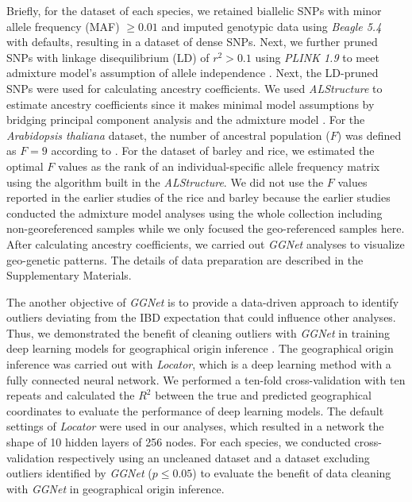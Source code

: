 \documentclass[11pt]{article}
\begin{document}
Briefly, for the dataset of each species, we retained biallelic SNPs with minor allele frequency (MAF) $\geq 0.01$ and imputed genotypic data using \textit{Beagle 5.4} \citep{browning2018one} with defaults, resulting in a dataset of dense SNPs.
Next, we further pruned SNPs with linkage disequilibrium (LD) of $r^2 > 0.1$ using \textit{PLINK 1.9} \citep{chang2015second} to meet admixture model's assumption of allele independence \citep{cabreros2019likelihood}.
Next, the LD-pruned SNPs were used for calculating ancestry coefficients.
We used \textit{ALStructure} \citep{cabreros2019likelihood} to estimate ancestry coefficients since it makes minimal model assumptions by bridging principal component analysis and the admixture model \citep{cabreros2019likelihood}.
For the \textit{Arabidopsis thaliana} dataset, the number of ancestral population ($F$) was defined as $F=9$ according to \cite{alonso20161}.
For the dataset of barley and rice, we estimated the optimal $F$ values as the rank of an individual-specific allele frequency matrix using the algorithm built in the \textit{ALStructure}.
We did not use the $F$ values reported in the earlier studies of the rice \citep{alonso20161} and barley \citep{milner2019genebank} because the earlier studies conducted the admixture model analyses using the whole collection including non-georeferenced samples while we only focused the geo-referenced samples here.
After calculating ancestry coefficients, we carried out \textit{GGNet} analyses to visualize geo-genetic patterns.
The details of data preparation are described in the Supplementary Materials.


The another objective of \textit{GGNet} is to provide a data-driven approach to identify outliers deviating from the IBD expectation that could influence other analyses.
Thus, we demonstrated the benefit of cleaning outliers with \textit{GGNet} in training deep learning models for geographical origin inference \citep{battey2020predicting}.
The geographical origin inference was carried out with \textit{Locator}, which is a deep learning method with a fully connected neural network.
We performed a ten-fold cross-validation with ten repeats and calculated the $R^2$ between the true and predicted geographical coordinates to evaluate the performance of deep learning models.
The default settings of \textit{Locator} were used in our analyses, which resulted in a network the shape of 10 hidden layers of 256 nodes.
For each species, we conducted cross-validation respectively using an uncleaned dataset and a dataset excluding outliers identified by \textit{GGNet} ($p \leq 0.05$) to evaluate the benefit of data cleaning with \textit{GGNet} in geographical origin inference.
\end{document}
